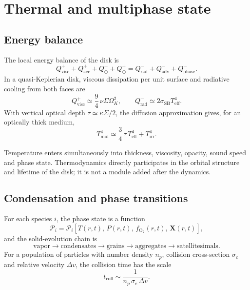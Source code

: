 \documentclass[11pt,a4paper,openany]{report}
\begin{document}
\section{Thermal and multiphase state}
\subsection{Energy balance}

The local energy balance of the disk is
\begin{equation}
Q^{+}_{\mathrm{visc}}+Q^{+}_{\mathrm{acc}}+Q^{+}_{\oplus}+Q^{+}_{\odot}
=Q^{-}_{\mathrm{rad}}+Q^{-}_{\mathrm{adv}}+Q^{-}_{\mathrm{phase}}.
\label{eq:bilanE}
\end{equation}
In a quasi-Keplerian disk, viscous dissipation per unit surface and radiative cooling from both
faces are
\begin{equation}
Q^{+}_{\mathrm{visc}}\simeq\frac94\,\nu\Sigma\Omega_K^2,
\qquad
Q^{-}_{\mathrm{rad}}\simeq2\sigma_{\mathrm{SB}}T_{\mathrm{eff}}^4.
\label{eq:Qvisc}
\end{equation}
With vertical optical depth $\tau\simeq\kappa\Sigma/2$, the diffusion approximation gives, for an
optically thick medium,
\begin{equation}
T_{\mathrm{mid}}^4\simeq\frac34\,\tau\,T_{\mathrm{eff}}^4+T_{\mathrm{irr}}^4.
\label{eq:Tmid}
\end{equation}

\begin{lecture}
Temperature enters simultaneously into thickness, viscosity, opacity, sound speed and phase state.
Thermodynamics directly participates in the orbital structure and lifetime of the disk; it is not a
module added after the dynamics.
\end{lecture}

\subsection{Condensation and phase transitions}

For each species $i$, the phase state is a function
\begin{equation}
\mathcal{P}_i=\mathcal{P}_i\!\left[T(r,t),\,P(r,t),\,f_{\mathrm{O_2}}(r,t),\,\mathbf{X}(r,t)\right],
\label{eq:phase}
\end{equation}
and the solid-evolution chain is
\begin{equation}
\text{vapor}\rightarrow\text{condensates}\rightarrow\text{grains}\rightarrow
\text{aggregates}\rightarrow\text{satellitesimals}.
\label{eq:chaine}
\end{equation}
For a population of particles with number density $n_p$, collision cross-section $\sigma_c$ and
relative velocity $\Delta v$, the collision time has the scale
\begin{equation}
t_{\mathrm{coll}}\sim\frac{1}{n_p\,\sigma_c\,\Delta v}.
\label{eq:tcoll}
\end{equation}
\end{document}
